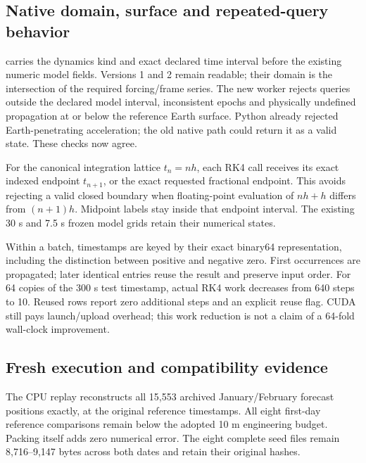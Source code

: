 \subsection{Native domain, surface and repeated-query behavior}
 carries the dynamics kind and exact declared time
interval before the existing numeric model fields. Versions 1 and 2 remain
readable; their domain is the intersection of the required forcing/frame series.
The new worker rejects queries outside the declared model interval, inconsistent
epochs and physically undefined propagation at or below the reference Earth
surface. Python already rejected Earth-penetrating acceleration; the old native
path could return it as a valid state. These checks now agree.

For the canonical integration lattice $t_n=nh$, each RK4 call receives its exact
indexed endpoint $t_{n+1}$, or the exact requested fractional endpoint. This avoids
rejecting a valid closed boundary when floating-point evaluation of $nh+h$ differs
from $(n+1)h$. Midpoint labels stay inside that endpoint interval. The existing
30 s and 7.5 s frozen model grids retain their numerical states.

Within a batch, timestamps are keyed by their exact binary64 representation,
including the distinction between positive and negative zero. First occurrences
are propagated; later identical entries reuse the result and preserve input
order. For 64 copies of the 300 s test timestamp, actual RK4 work decreases from
640 steps to 10. Reused rows report zero additional steps and an explicit reuse
flag. CUDA still pays launch/upload overhead; this work reduction is not a claim
of a 64-fold wall-clock improvement.

\subsection{Fresh execution and compatibility evidence}
The CPU replay reconstructs all 15,553 archived January/February forecast
positions exactly, at the original reference timestamps. All eight first-day
reference comparisons remain below the adopted 10 m engineering budget.
Packing itself adds zero numerical error. The eight complete seed files remain
8,716--9,147 bytes across both dates and retain their original hashes.


